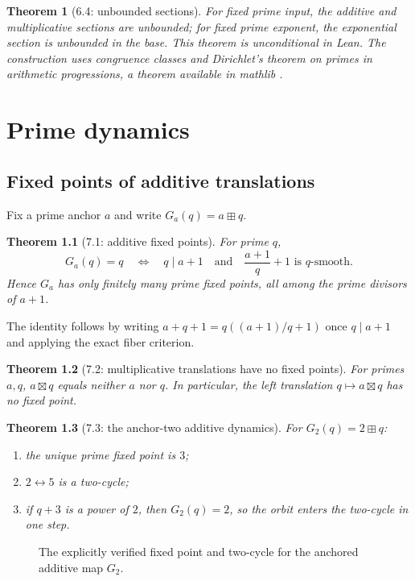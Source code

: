 \documentclass[11pt,a4paper,oneside,open=any,headings=small]{scrbook}
\newtheorem{theorem}{Theorem}[chapter]
\theoremstyle{definition}
\begin{document}
\begin{theorem}[6.4: unbounded sections]
For fixed prime input, the additive and multiplicative sections are unbounded; for fixed prime exponent, the exponential section is unbounded in the base. This theorem is unconditional in Lean. The construction uses congruence classes and Dirichlet's theorem on primes in arithmetic progressions, a theorem available in mathlib \parencite{MathlibPrimesInAP}.
\end{theorem}

\chapter{Prime dynamics}\label{ch:dynamics}

\section{Fixed points of additive translations}
Fix a prime anchor $a$ and write $G_a(q)=a\boxplus q$.
\begin{theorem}[7.1: additive fixed points]
For prime $q$,
\[
G_a(q)=q
\quad\Longleftrightarrow\quad
q\mid a+1\quad\text{and}\quad
\frac{a+1}{q}+1\text{ is $q$-smooth}.
\]
Hence $G_a$ has only finitely many prime fixed points, all among the prime divisors of $a+1$.
\end{theorem}
The identity follows by writing $a+q+1=q((a+1)/q+1)$ once $q\mid a+1$ and applying the exact fiber criterion.

\begin{theorem}[7.2: multiplicative translations have no fixed points]
For primes $a,q$, $a\boxtimes q$ equals neither $a$ nor $q$. In particular, the left translation $q\mapsto a\boxtimes q$ has no fixed point.
\end{theorem}

\begin{theorem}[7.3: the anchor-two additive dynamics]
For $G_2(q)=2\boxplus q$:
\begin{enumerate}[label=(\alph*)]
\item the unique prime fixed point is $3$;
\item $2\leftrightarrow5$ is a two-cycle;
\item if $q+3$ is a power of $2$, then $G_2(q)=2$, so the orbit enters the two-cycle in one step.
\end{enumerate}
\end{theorem}

\begin{figure}[H]
\centering
\AnchorTwoDiagram
\caption{The explicitly verified fixed point and two-cycle for the anchored additive map $G_2$.}
\label{fig:g2}
\end{figure}
\end{document}
